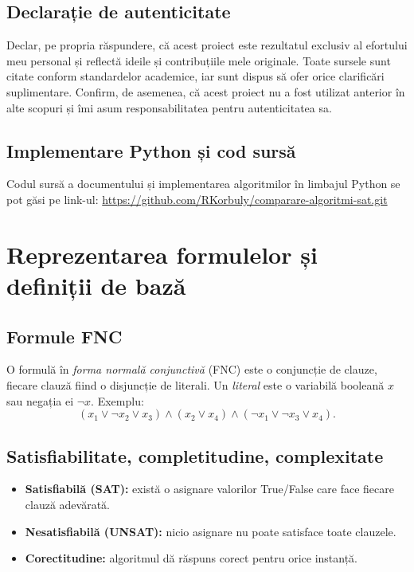 \documentclass[12pt]{article}
\begin{document}
\subsection{Declarație de autenticitate}
Declar, pe propria răspundere, că acest proiect este rezultatul exclusiv al efortului meu personal și reflectă ideile și contribuțiile mele originale. Toate sursele sunt citate conform standardelor academice, iar sunt dispus să ofer orice clarificări suplimentare. Confirm, de asemenea, că acest proiect nu a fost utilizat anterior în alte scopuri și îmi asum responsabilitatea pentru autenticitatea sa.
\subsection{Implementare Python și cod sursă}
Codul sursă a documentului și implementarea algoritmilor în limbajul Python se pot găsi pe link-ul: \href{https://github.com/RKorbuly/comparare-algoritmi-sat.git}{https://github.com/RKorbuly/comparare-algoritmi-sat.git}
\section{Reprezentarea formulelor și definiții de bază}
\subsection{Formule FNC}
O formulă în \emph{forma normală conjunctivă} (FNC) este o conjuncție de clauze, fiecare clauză fiind o disjuncție de literali. Un \emph{literal} este o variabilă booleană $x$ sau negația ei $\neg x$. Exemplu:
\[
  (x_1\lor\neg x_2\lor x_3)\land(x_2 \lor x_4)\land(\neg x_1\lor\neg x_3\lor{x_4}).
\]

\subsection{Satisfiabilitate, completitudine, complexitate}
\begin{itemize}
  \item \textbf{Satisfiabilă (SAT):} există o asignare valorilor True/False care face fiecare clauză adevărată.
  \item \textbf{Nesatisfiabilă (UNSAT):} nicio asignare nu poate satisface toate clauzele.
  \item \textbf{Corectitudine:} algoritmul dă răspuns corect pentru orice instanță.
\end{itemize}
\end{document}
